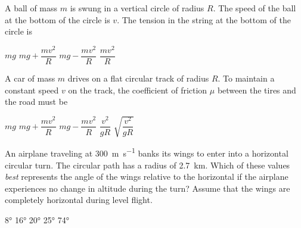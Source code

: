 \documentclass{../../../oss-apphys-exam}
\begin{document}
\begin{questions}
%      
%    
    
  \question A ball of mass $m$ is swung in a vertical circle of radius $R$. The
  speed of the ball at the bottom of the circle is $v$. The tension in the
  string at the bottom of the circle is
  \begin{choices}
    \choice $mg$
    \choice $mg+\dfrac{mv^2}R$
    \choice $mg-\dfrac{mv^2}R$
    \choice $\dfrac{mv^2}R$
  \end{choices}
    
  \question A car of mass $m$ drives on a flat circular track of radius $R$. To
  maintain a constant speed $v$ on the track, the coefficient of friction $\mu$
  between the tires and the road must be
  \begin{choices}
    \choice $mg$
    \choice $mg+\dfrac{mv^2}R$
    \choice $mg-\dfrac{mv^2}R$
    \choice $\dfrac{v^2}{gR}$
    \choice $\sqrt{\dfrac{v^2}{gR}}$
  \end{choices}
    
  \question An airplane traveling at \SI{300}{\metre\per\second} banks its
  wings to enter into a horizontal circular turn. The circular path has a
  radius of \SI{2.7}{\kilo\metre}. Which of these values \emph{best} represents
  the angle of the wings relative to the horizontal if the airplane experiences
  no change in altitude during the turn? Assume that the wings are completely
  horizontal during level flight.
  \begin{choices}
    \choice\ang{8}
    \choice\ang{16}
    \choice\ang{20}
    \choice\ang{25}
    \correctchoice\ang{74}
  \end{choices}
  \newpage
  

\end{questions}
\end{document}
